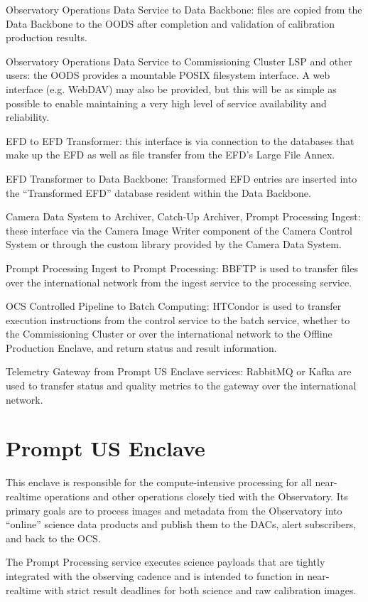 \documentclass[DM,toc,lsstdraft]{lsstdoc}
\begin{document}
Observatory Operations Data Service to Data Backbone: files are copied from the Data Backbone to the OODS after completion and validation of calibration production results.

Observatory Operations Data Service to Commissioning Cluster LSP and other users: the OODS provides a mountable POSIX filesystem interface.
A web interface (e.g. WebDAV) may also be provided, but this will be as simple as possible to enable maintaining a very high level of service availability and reliability.

EFD to EFD Transformer: this interface is via connection to the
databases that make up the EFD as well as file transfer from the EFD's
Large File Annex.

EFD Transformer to Data Backbone: Transformed EFD entries are inserted
into the ``Transformed EFD'' database resident within the Data Backbone.

Camera Data System to Archiver, Catch-Up Archiver, Prompt Processing
Ingest: these interface via the Camera Image Writer component of the Camera Control System or through the custom library provided by the
Camera Data System.

Prompt Processing Ingest to Prompt Processing: BBFTP is used to transfer
files over the international network from the ingest service to the
processing service.

OCS Controlled Pipeline to Batch Computing: HTCondor is
used to transfer execution instructions
from the control service to the batch service, whether to the Commissioning Cluster or over the international network to the Offline Production Enclave, and return status and
result information.

Telemetry Gateway from Prompt US Enclave services: RabbitMQ or Kafka are
used to transfer status and quality metrics to the gateway over the
international network.

\section{Prompt US Enclave}\label{prompt-us-enclave}

This enclave is responsible for the compute-intensive processing for all
near-realtime operations and other operations closely tied with the
Observatory. Its primary goals are to process images and metadata from
the Observatory into ``online'' science data products and publish them
to the DACs, alert subscribers, and back to the OCS.

The Prompt Processing service executes science payloads that are tightly integrated with the observing cadence and is intended to function in near-realtime with strict result deadlines for both science and raw calibration images.
\end{document}
